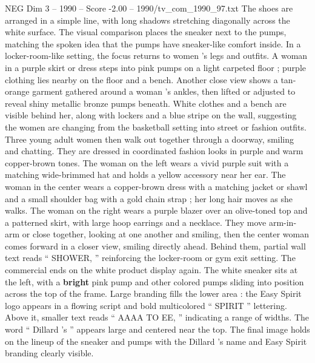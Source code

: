 \begin{textsample}{NEG Dim 3 – 1990 – Score -2.00 – 1990/tv\_com\_1990\_97.txt}
The shoes are arranged in a simple line, with long shadows stretching diagonally across the white surface.
The visual comparison places the sneaker next to the pumps, matching the spoken idea that the pumps have sneaker-like comfort inside.
In a locker-room-like setting, the focus returns to women ’s legs and outfits.
A woman in a purple skirt or dress steps into pink pumps on a light carpeted floor ; purple clothing lies nearby on the floor and a bench.
Another close view shows a tan-orange garment gathered around a woman ’s ankles, then lifted or adjusted to reveal shiny metallic bronze pumps beneath.
White clothes and a bench are visible behind her, along with lockers and a blue stripe on the wall, suggesting the women are changing from the basketball setting into street or fashion outfits.
Three young adult women then walk out together through a doorway, smiling and chatting.
They are dressed in coordinated fashion looks in purple and warm copper-brown tones.
The woman on the left wears a vivid purple suit with a matching wide-brimmed hat and holds a yellow accessory near her ear.
The woman in the center wears a copper-brown dress with a matching jacket or shawl and a small shoulder bag with a gold chain strap ; her long hair moves as she walks.
The woman on the right wears a purple blazer over an olive-toned top and a patterned skirt, with large hoop earrings and a necklace.
They move arm-in-arm or close together, looking at one another and smiling, then the center woman comes forward in a closer view, smiling directly ahead.
Behind them, partial wall text reads “ SHOWER, ” reinforcing the locker-room or gym exit setting.
The commercial ends on the white product display again.
The white sneaker sits at the left, with a \textbf{bright} pink pump and other colored pumps sliding into position across the top of the frame.
Large branding fills the lower area : the Easy Spirit logo appears in a flowing script and bold multicolored “ SPIRIT ” lettering.
Above it, smaller text reads “ AAAA TO EE, ” indicating a range of widths.
The word “ Dillard ’s ” appears large and centered near the top.
The final image holds on the lineup of the sneaker and pumps with the Dillard ’s name and Easy Spirit branding clearly visible.

\end{textsample}
